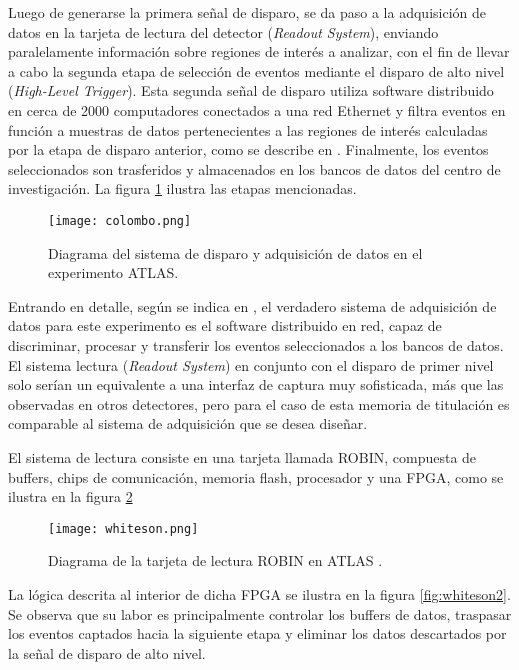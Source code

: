 	\newpage
	Luego de generarse la primera señal de disparo, se da paso a la adquisición de datos en la tarjeta de lectura del detector (\textit{Readout System}), enviando paralelamente información sobre regiones de interés a analizar, con el fin de llevar a cabo la segunda etapa de selección de eventos mediante el disparo de alto nivel (\textit{High-Level Trigger}). Esta segunda señal de disparo utiliza software distribuido en cerca de 2000 computadores conectados a una red Ethernet y filtra eventos en función a muestras de datos pertenecientes a las regiones de interés calculadas por la etapa de disparo anterior, como se describe en \cite{Colombo2015Data-flowCase}. Finalmente, los eventos seleccionados son trasferidos y  almacenados en los bancos de datos del centro de investigación. La figura \ref{fig:colombo} ilustra las etapas mencionadas.
	
	\begin{figure}[h]
		\centering
		\texttt{[image: colombo.png]}
		\caption{Diagrama del sistema de disparo y adquisición de datos en el experimento ATLAS. \cite{Colombo2015Data-flowCase}}
		\label{fig:colombo}
	\end{figure}
	
	Entrando en detalle, según se indica en \cite{Whiteson2016TheSystem}, el verdadero sistema de adquisición de datos para este experimento es el software distribuido en red, capaz de discriminar, procesar y transferir los eventos seleccionados a los bancos de datos. El sistema lectura (\textit{Readout System}) en conjunto con el disparo de primer nivel solo serían un equivalente a una interfaz de captura muy sofisticada, más que las observadas en otros detectores, pero para el caso de esta memoria de titulación es comparable al sistema de adquisición que se desea diseñar.
	
	El sistema de lectura consiste en una tarjeta llamada ROBIN, compuesta de buffers, chips de comunicación, memoria flash, procesador y una FPGA, como se ilustra en la figura \ref{fig:whiteson}
	
	\begin{figure}[h]
		\centering
		\texttt{[image: whiteson.png]}
		\caption{Diagrama de la tarjeta de lectura ROBIN en ATLAS \cite{Whiteson2016TheSystem}.}
		\label{fig:whiteson}
	\end{figure}
	
	La lógica descrita al interior de dicha FPGA se ilustra en la figura \ref{fig:whiteson2}. Se observa que su labor es principalmente controlar los buffers de datos, traspasar los eventos captados hacia la siguiente etapa y eliminar los datos descartados por la señal de disparo de alto nivel.
	

